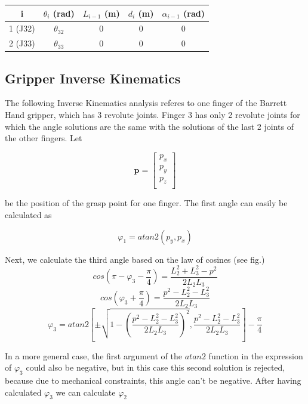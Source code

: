 \begin{center}
\begin{tabular}{ |c|c|c|c|c| } 
\hline
i & $θ_i$ (rad) & $L_{i-1}$ (m) & $d_i$ (m) & $α_{i-1}$ (rad) \\
\hline
1 (J32) & $θ_{32}$ & 0 & 0 & 0 \\
2 (J33) & $θ_{33}$ & 0 & 0 & 0 \\
\hline
\end{tabular}
\end{center}


\subsection{Gripper Inverse Kinematics}

The following Inverse Kinematics analysis referes to one finger of the Barrett Hand gripper, which has 3 revolute joints. Finger 3 has only 2 
revolute joints for which the angle solutions are the same with the solutions of the last 2 joints of the other fingers. Let

\[
\mathbf{p} = \begin{bmatrix} p_x \\ p_y \\ p_z \\ \end{bmatrix}
\]

be the position of the grasp point for one finger. The first angle can easily be calculated as

\begin{equation}
φ_1 = atan2 \left( p_y, p_x \right)
\end{equation}

Next, we calculate the third angle based on the law of cosines (see fig.)
\[
cos \left( π - φ_3 - \frac{π}{4} \right) = \frac{L_2^2 + L_3^2 - p^2}{2 L_2 L_3}
\]
\[
cos \left(φ_3 + \frac{π}{4} \right) = \frac{p^2 - L_2^2 - L_3^2}{2 L_2 L_3}
\]
\begin{equation}
φ_3 = atan2 \left[ \pm \sqrt{1 - \left( \frac{p^2 - L_2^2 - L_3^2}{2 L_2 L_3} \right)^2} , \frac{p^2 - L_2^2 - L_3^2}{2 L_2 L_3} \right] - \frac{π}{4}
\end{equation}

In a more general case, the first argument of the $atan2$ function in the expression of $φ_3$ could also be negative,
but in this case this second solution is rejected, because due to mechanical constraints, this angle can't be negative. 
After having calculated $φ_3$ we can calculate $φ_2 $

